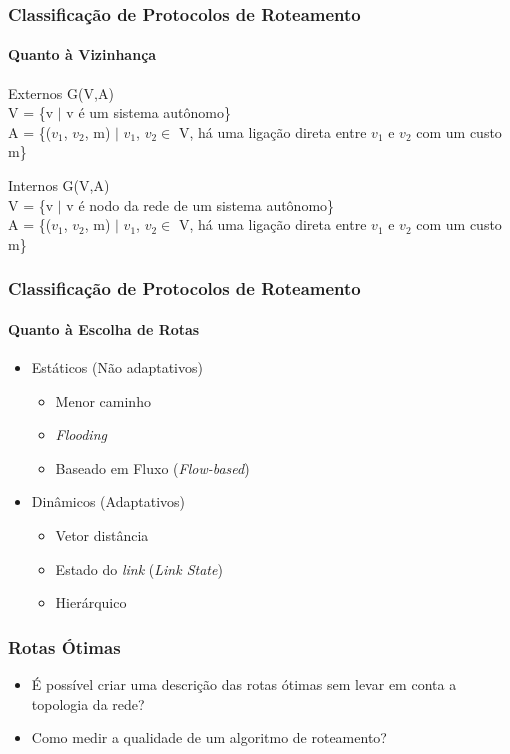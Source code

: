 \documentclass{beamer}
\begin{document}
\begin{frame}
\frametitle{Classificação de Protocolos de Roteamento}
\framesubtitle{Quanto à Vizinhança}
\begin{block}{Externos}
G(V,A)\\
V = \{v $\mid$ v  é um sistema autônomo\}\\
A = \{($v_1$, $v_2$, m) $\mid$ $v_1$, $v_2 \in$ V, há uma ligação direta
entre $v_1$ e $v_2$  com um custo m\}
\end{block}

\begin{block}{Internos}
G(V,A)\\
V = \{v $\mid$ v é nodo da rede de um sistema autônomo\}\\
A = \{($v_1$, $v_2$, m) $\mid$ $v_1$, $v_2 \in$ V, há uma ligação direta
entre $v_1$ e $v_2$  com um custo m\}
\end{block}
\end{frame}

\begin{frame}
\frametitle{Classificação de Protocolos de Roteamento}
\framesubtitle{Quanto à Escolha de Rotas}
\begin{itemize}
  \item Estáticos (Não adaptativos)
  \begin{itemize}
     \item Menor caminho
     \item \emph{Flooding}
     \item Baseado em Fluxo (\emph{Flow-based}) 
  \end{itemize}
  \item Dinâmicos (Adaptativos)
  \begin{itemize}
     \item Vetor distância
     \item Estado do \emph{link} (\emph{Link State})
     \item Hierárquico 
  \end{itemize}
\end{itemize}

\end{frame}

\begin{frame}
\frametitle{Rotas Ótimas}
\begin{itemize}
  \setlength{\itemsep}{0.7cm}%
  \item É possível criar uma descrição das rotas ótimas sem levar em conta a
  topologia da rede?
  \item Como medir a qualidade de um algoritmo de roteamento?
\end{itemize}
\end{frame}
\end{document}
